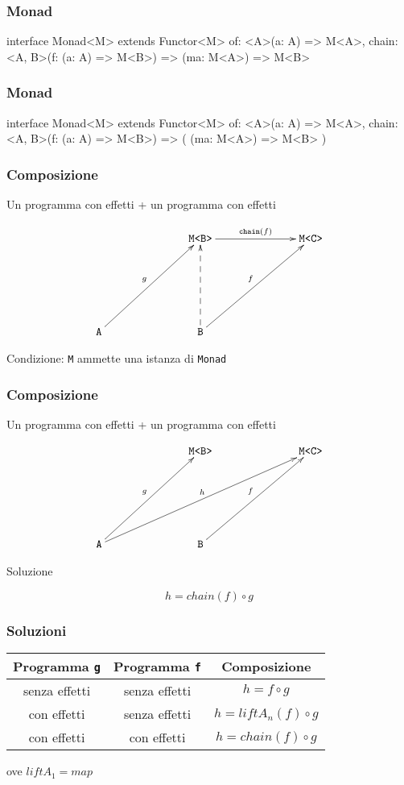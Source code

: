 \documentclass{beamer}
\newenvironment{code}
  {\vspace{0.5cm} \VerbatimEnvironment\begin{typescriptcode}}
  {\end{typescriptcode} \vspace{0.2cm}}
\begin{document}
\begin{frame}[fragile]
\frametitle{Monad}

\begin{code}
interface Monad<M> extends Functor<M> {
  of: <A>(a: A) => M<A>,
  chain: <A, B>(f: (a: A) => M<B>) => (ma: M<A>) => M<B>
}
\end{code}

\end{frame}

\begin{frame}[fragile]
\frametitle{Monad}

\begin{code}
interface Monad<M> extends Functor<M> {
  of: <A>(a: A) => M<A>,
  chain: <A, B>(f: (a: A) => M<B>) => ( (ma: M<A>) => M<B> )
}
\end{code}

\end{frame}

\begin{frame}
\frametitle{Composizione}

Un programma con effetti + un programma con effetti

\[
\xymatrixrowsep{2.5cm}
\xymatrixcolsep{2.5cm}
\xymatrix{
  & \texttt{M<B>} \ar[r]^{\texttt{chain}(f)} & \texttt{M<C>} \\
  \texttt{A} \ar[ur]^{g} & \texttt{B} \ar[ur]^{f} \ar@{-->}[u]
}
\]

Condizione: \texttt{M} ammette una istanza di \texttt{Monad}

\end{frame}

\begin{frame}
\frametitle{Composizione}

Un programma con effetti + un programma con effetti

\[
\xymatrixrowsep{2.5cm}
\xymatrixcolsep{2.5cm}
\xymatrix{
  & \texttt{M<B>} & \texttt{M<C>} \\
  \texttt{A} \ar[ur]^{g} \ar[urr]^{h} & \texttt{B} \ar[ur]^{f}
}
\]

Soluzione

$$
h = chain(f) \circ g
$$

\end{frame}

\begin{frame}
\frametitle{Soluzioni}

\begin{center}
\bgroup
\def\arraystretch{1.5}
\begin{tabular}{ |c|c|c| }
\hline
Programma \texttt{g} & Programma \texttt{f} & Composizione \\
\hline
senza effetti & senza effetti & $h = f \circ g$ \\
\hline
con effetti & senza effetti & $h = liftA_n(f) \circ g$ \\
\hline
con effetti & con effetti & $h = chain(f) \circ g$ \\
\hline
\end{tabular}
\egroup
\end{center}

\begin{center}
ove $liftA_1 = map$
\end{center}

\end{frame}
\end{document}
